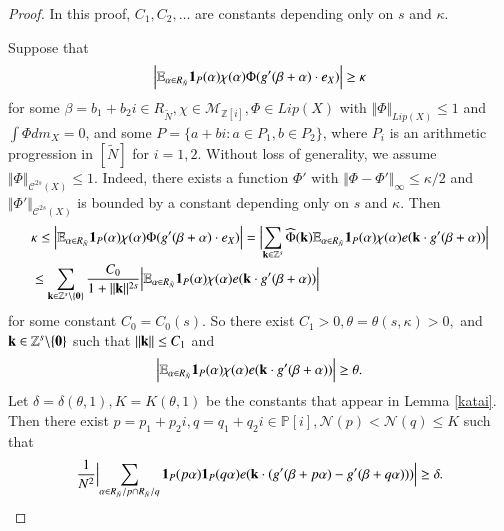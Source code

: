 \documentclass[12pt,amstex]{amsart}
\theoremstyle{definition}
\def \Z {\mathbb{Z}[i]}
\def \P {\mathbb{P}[i]}
\def \A {\alpha}
\def \B {\beta}
\def \D {\kappa}
\def \d {\delta}
\def \R {R_{\tilde{N}}}
\begin{document}
\begin{proof}
  In this proof, $C_{1},C_{2},\dots$ are constants depending only on $s$ and $\D$.

 Suppose that
    \begin{equation}\nonumber
  \begin{split}
    \Bigl\vert\mathbb{E}_{\A\in \R}\bold{1}_{P}(\A)\chi(\A)\Phi(g'(\B+\A)\cdot e_{X})\Bigr\vert\geq\D
  \end{split}
  \end{equation}
  for some $\B=b_{1}+b_{2}i\in \R, \chi\in\mathcal{M}_{\Z}, \Phi\in Lip(X)$ with $\Vert\Phi\Vert_{Lip(X)}\leq 1$ and $\int\Phi dm_{X}=0$, and some $P=\{a+bi\colon a\in P_{1}, b\in P_{2}\}$, where $P_{i}$ is an arithmetic progression in $[\tilde{N}]$ for $i=1,2$.  Without loss of generality, we assume $\Vert\Phi\Vert_{\mathcal{C}^{2s}(X)}\leq 1$.
Indeed,
there exists a function $\Phi'$ with $\Vert\Phi-\Phi'\Vert_{\infty}\leq \D/2$ and 
$\Vert\Phi'\Vert_{\mathcal{C}^{2s}(X)}$ is bounded by a constant depending only on $s$ and $\D$.
 Then
 \begin{equation}\nonumber
  \begin{split}
    &\D\leq\Bigl\vert\mathbb{E}_{\A\in \R}\bold{1}_{P}(\A)\chi(\A)\Phi(g'(\B+\A)\cdot e_{X})\Bigr\vert
    =\Bigl\vert\sum_{\bold{k}\in\mathbb{Z}^{s}}\widehat{\Phi}(\bold{k})\mathbb{E}_{\A\in \R}\bold{1}_{P}(\A)\chi(\A)e(\bold{k}\cdot g'(\B+\A))\Bigr\vert
    \\&\leq\sum_{\bold{k}\in\mathbb{Z}^{s}\backslash{\{\bold{0}\}}}\frac{C_{0}}{1+\Vert\bold{k}\Vert^{2s}}\Bigl\vert\mathbb{E}_{\A\in \R}\bold{1}_{P}(\A)\chi(\A)e(\bold{k}\cdot g'(\B+\A))\Bigr\vert
  \end{split}
  \end{equation}
  for some constant $C_{0}=C_{0}(s)$.
   So there exist $C_{1}>0, \theta=\theta(s,\D)>0,$ and $\bold{k}\in\mathbb{Z}^{s}\backslash{\{\bold{0}\}}$ such that $\Vert \bold{k}\Vert\leq C_{1}$ and
  \begin{equation}\nonumber
  \begin{split}
    \Bigl\vert\mathbb{E}_{\A\in \R}\bold{1}_{P}(\A)\chi(\A)e(\bold{k}\cdot g'(\B+\A))\Bigr\vert\geq\theta.
  \end{split}
  \end{equation}
  Let $\d=\d(\theta,1),K=K(\theta,1)$ be the constants that appear in Lemma \ref{katai}. Then there exist $p=p_{1}+p_{2}i,q=q_{1}+q_{2}i\in\P, \mathcal{N}(p)<\mathcal{N}(q)\leq K$ such that
   \begin{equation}\nonumber
  \begin{split}
    \frac{1}{N^{2}}\Bigl\vert\sum_{\A\in \R/p\cap \R/q}\bold{1}_{P}(p\A)\bold{1}_{P}(q\A)e(\bold{k}\cdot (g'(\B+p\A)-g'(\B+q\A)))\Bigr\vert\geq\d.
  \end{split}
\end{equation}


\end{proof}
\end{document}
